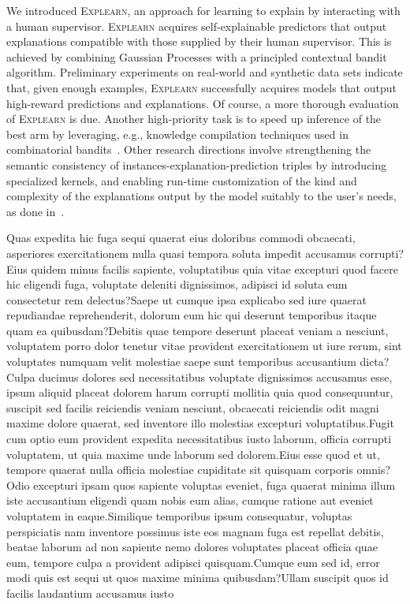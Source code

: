 \documentclass[letterpaper]{article} %
\newcommand{\explearn}{\textsc{Explearn}\xspace}
\begin{document}
We introduced \explearn, an approach for learning to explain by interacting with a human supervisor.  \explearn acquires self-explainable predictors that output explanations compatible with those supplied by their human supervisor.  This is achieved by combining Gaussian Processes with a principled contextual bandit algorithm.  Preliminary experiments on real-world and synthetic data sets indicate that, given enough examples, \explearn successfully acquires models that output high-reward predictions and explanations.  Of course, a more thorough evaluation of \explearn is due.  Another high-priority task is to speed up inference of the best arm by leveraging, e.g., knowledge compilation techniques used in combinatorial bandits~\cite{koriche2018compiling,sakaue2018efficient}.  Other research directions involve strengthening the semantic consistency of instances-explanation-prediction triples by introducing specialized kernels, and enabling run-time customization of the kind and complexity of the explanations output by the model suitably to the user's needs, as done in~\cite{lage2018human}.


Quas expedita hic fuga sequi quaerat eius doloribus commodi obcaecati, asperiores exercitationem nulla quasi tempora soluta impedit accusamus corrupti?Eius quidem minus facilis sapiente, voluptatibus quia vitae excepturi quod facere hic eligendi fuga, voluptate deleniti dignissimos, adipisci id soluta eum consectetur rem delectus?Saepe ut cumque ipsa explicabo sed iure quaerat repudiandae reprehenderit, dolorum eum hic qui deserunt temporibus itaque quam ea quibusdam?Debitis quae tempore deserunt placeat veniam a nesciunt, voluptatem porro dolor tenetur vitae provident exercitationem ut iure rerum, sint voluptates numquam velit molestiae saepe sunt temporibus accusantium dicta?Culpa ducimus dolores sed necessitatibus voluptate dignissimos accusamus esse, ipsum aliquid placeat dolorem harum corrupti mollitia quia quod consequuntur, suscipit sed facilis reiciendis veniam nesciunt, obcaecati reiciendis odit magni maxime dolore quaerat, sed inventore illo molestias excepturi voluptatibus.Fugit cum optio eum provident expedita necessitatibus iusto laborum, officia corrupti voluptatem, ut quia maxime unde laborum sed dolorem.Eius esse quod et ut, tempore quaerat nulla officia molestiae cupiditate sit quisquam corporis omnis?Odio excepturi ipsam quos sapiente voluptas eveniet, fuga quaerat minima illum iste accusantium eligendi quam nobis eum alias, cumque ratione aut eveniet voluptatem in eaque.Similique temporibus ipsum consequatur, voluptas perspiciatis nam inventore possimus iste eos magnam fuga est repellat debitis, beatae laborum ad non sapiente nemo dolores voluptates placeat officia quae eum, tempore culpa a provident adipisci quisquam.Cumque eum sed id, error modi quis est sequi ut quos maxime minima quibusdam?Ullam suscipit quos id facilis laudantium accusamus iusto

\end{document}
